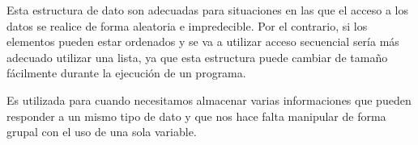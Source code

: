 Esta estructura de dato son adecuadas para situaciones en las que el acceso a los datos se realice de forma aleatoria e impredecible. Por el contrario, si los elementos pueden estar ordenados y se va a utilizar acceso secuencial sería más adecuado utilizar una lista, ya que esta estructura puede cambiar de tamaño fácilmente durante la ejecución de un programa.

Es utilizada para cuando necesitamos almacenar varias informaciones que pueden responder a un mismo tipo de dato y que nos hace falta manipular de forma grupal con el uso de una sola variable.